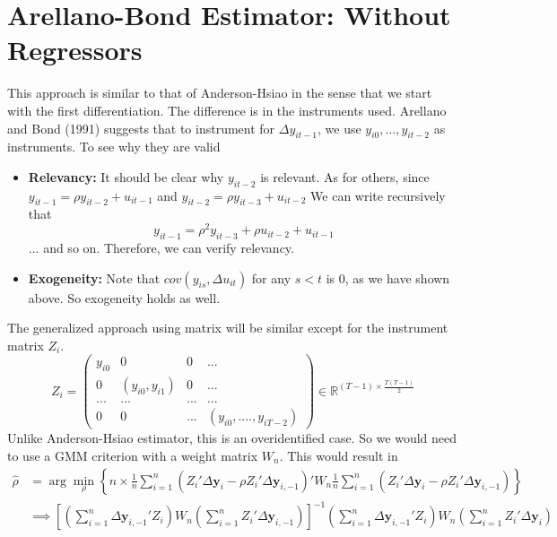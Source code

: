 \section{Arellano-Bond Estimator: Without Regressors}
This approach is similar to that of Anderson-Hsiao in the sense that we start with the first differentiation. The difference is in the instruments used. Arellano and Bond (1991) suggests that to instrument for $\Delta y_{it-1}$, we use $y_{i0},...,y_{it-2}$ as instruments. To see why they are valid
\begin{itemize}
\item \textbf{Relevancy:} It should be clear why $y_{it-2}$ is relevant. As for others, since $y_{it-1}=\rho y_{it-2}+u_{it-1}$ and $y_{it-2}=\rho y_{it-3}+u_{it-2}$ We can write recursively that
\[
y_{it-1} = \rho^2 y_{it-3}+\rho u_{it-2} + u_{it-1}
\]
... and so on. Therefore, we can verify relevancy.
\item \textbf{Exogeneity:} Note that $cov(y_{is},\Delta u_{it})$ for any $s<t$ is 0, as we have shown above. So exogeneity holds as well. 
\end{itemize}
The generalized approach using matrix will be similar except for the instrument matrix $Z_i$.
\[
Z_i = \begin{pmatrix}y_{i0}& 0 & 0 & ... \\ 0 & (y_{i0},y_{i1})& 0 & ... \\ ... & ... &...&...\\ 0 & 0 & ... & (y_{i0},....,y_{iT-2}) \end{pmatrix}\in\mathbb{R}^{(T-1)\times \frac{T(T-1)}{2}}
\]
Unlike Anderson-Hsiao estimator, this is an overidentified case. So we would need to use a GMM criterion with a weight matrix $W_n$. This would result in
\begin{align*}
\hat{\rho}&=\arg\min_\rho \left\{n\times \frac{1}{n}\sum_{i=1}^n(Z_i'\Delta \mathbf{y}_i - \rho Z_i'\Delta \mathbf{y}_{i,-1})'W_n  \frac{1}{n}\sum_{i=1}^n(Z_i'\Delta \mathbf{y}_i - \rho Z_i'\Delta \mathbf{y}_{i,-1})\right\}\\
&\implies \left[\left(\sum_{i=1}^n\Delta \mathbf{y}_{i,-1}' Z_i\right)W_n\left(\sum_{i=1}^n Z_i' \Delta \mathbf{y}_{i,-1}\right) \right]^{-1}\left(\sum_{i=1}^n\Delta \mathbf{y}_{i,-1}' Z_i\right)W_n\left(\sum_{i=1}^n Z_i' \Delta \mathbf{y}_i \right)
\end{align*}


